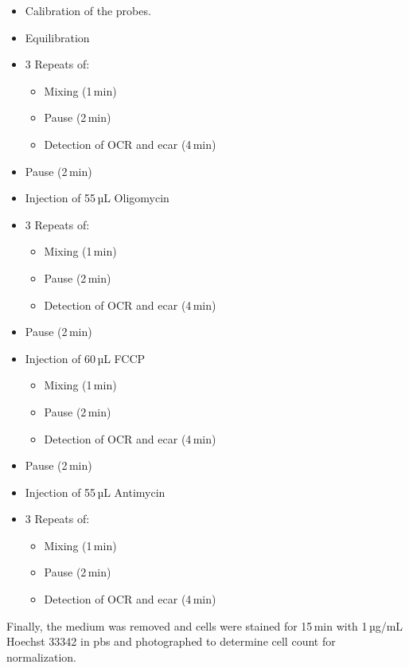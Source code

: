     \begin{itemize}
        \item Calibration of the probes.
        \item Equilibration
        \item 3 Repeats of:
        \begin{itemize}
            \item Mixing (1\,min)
            \item Pause (2\,min)
            \item Detection of OCR and \ac{ecar} (4\,min)
        \end{itemize}
        \item Pause (2\,min)
        \item Injection of 55\,µL Oligomycin
        \item 3 Repeats of:
        \begin{itemize}
            \item Mixing (1\,min)
            \item Pause (2\,min)
            \item Detection of OCR and \ac{ecar} (4\,min)
        \end{itemize}
        \item Pause (2\,min)
        \item Injection of 60\,µL FCCP
        \begin{itemize}
            \item Mixing (1\,min)
            \item Pause (2\,min)
            \item Detection of OCR and \ac{ecar} (4\,min)
        \end{itemize}
        \item Pause (2\,min)
        \item Injection of 55\,µL Antimycin
        \item 3 Repeats of:
        \begin{itemize}
            \item Mixing (1\,min)
            \item Pause (2\,min)
            \item Detection of OCR and \ac{ecar} (4\,min)
        \end{itemize}
    \end{itemize}

    Finally, the medium was removed and cells were stained for 15\,min with 1\,µg/mL Hoechst 33342 in \ac{pbs} and photographed to determine cell count for normalization.

